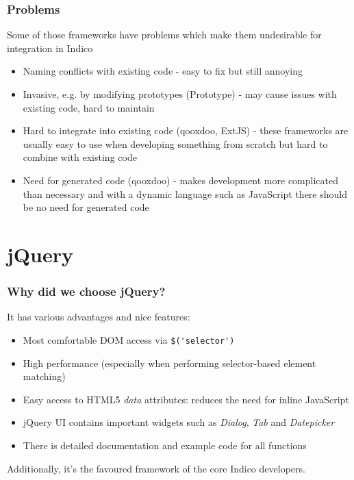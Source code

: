 \documentclass{beamer}
\begin{document}
\begin{frame}
  \frametitle{Problems}
  Some of those frameworks have problems which make them undesirable for integration in Indico
  \begin{itemize}
    \item Naming conflicts with existing code - easy to fix but still annoying
    \item Invasive, e.g. by modifying prototypes (Prototype) - may cause issues with existing code,
      hard to maintain
    \item Hard to integrate into existing code (qooxdoo, ExtJS) - these frameworks are usually easy
      to use when developing something from scratch but hard to combine with existing code
    \item Need for generated code (qooxdoo) - makes development more complicated than necessary and
      with a dynamic language such as JavaScript there should be no need for generated code
  \end{itemize}
\end{frame}

\section{jQuery}
\begin{frame}
  \frametitle{Why did we choose jQuery?}
  It has various advantages and nice features:
  \begin{itemize}
    \item Most comfortable DOM access via \lstinline{$('selector')}
    \item High performance (especially when performing selector-based element matching)
    \item Easy access to HTML5 \emph{data} attributes: reduces the need for inline JavaScript
    \item jQuery UI contains important widgets such as \emph{Dialog}, \emph{Tab} and \emph{Datepicker}
    \item There is detailed documentation and example code for all functions
  \end{itemize}

  Additionally, it's the favoured framework of the core Indico developers.
\end{frame}
\end{document}
